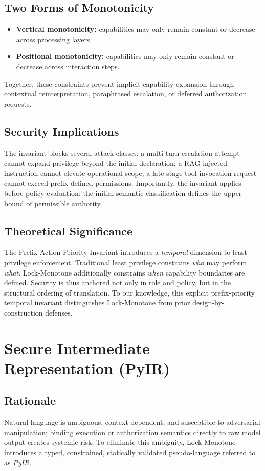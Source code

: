 \documentclass[conference]{IEEEtran}
\begin{document}
\subsection{Two Forms of Monotonicity}
\begin{itemize}
\item \textbf{Vertical monotonicity:} capabilities may only remain
constant or decrease across processing layers.
\item \textbf{Positional monotonicity:} capabilities may only remain
constant or decrease across interaction steps.
\end{itemize}
Together, these constraints prevent implicit capability expansion through
contextual reinterpretation, paraphrased escalation, or deferred
authorization requests.

\subsection{Security Implications}
The invariant blocks several attack classes: a multi-turn escalation
attempt cannot expand privilege beyond the initial declaration; a
RAG-injected instruction cannot elevate operational scope; a late-stage
tool invocation request cannot exceed prefix-defined permissions.
Importantly, the invariant applies before policy evaluation: the initial
semantic classification defines the upper bound of permissible authority.

\subsection{Theoretical Significance}
The Prefix Action Priority Invariant introduces a \emph{temporal}
dimension to least-privilege enforcement. Traditional least privilege
constrains \emph{who} may perform \emph{what}. Lock-Monotone additionally
constrains \emph{when} capability boundaries are defined. Security is thus
anchored not only in role and policy, but in the structural ordering of
translation. To our knowledge, this explicit prefix-priority temporal
invariant distinguishes Lock-Monotone from prior design-by-construction
defenses.

\section{Secure Intermediate Representation (PyIR)}
\label{sec:pyir}

\subsection{Rationale}
Natural language is ambiguous, context-dependent, and susceptible to
adversarial manipulation; binding execution or authorization semantics
directly to raw model output creates systemic risk. To eliminate this
ambiguity, Lock-Monotone introduces a typed, constrained, statically
validated pseudo-language referred to as \emph{PyIR}.
\end{document}
